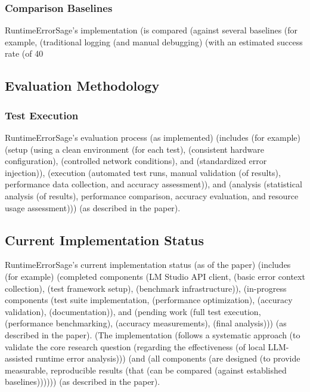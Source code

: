 \subsubsection{Comparison Baselines}
RuntimeErrorSage's implementation (is compared (against several baselines (for example, (traditional logging (and manual debugging) (with an estimated success rate (of 40%

\subsection{Evaluation Methodology}

\subsubsection{Test Execution}
RuntimeErrorSage's evaluation process (as implemented) (includes (for example) (setup (using a clean environment (for each test), (consistent hardware configuration), (controlled network conditions), and (standardized error injection)), (execution (automated test runs, manual validation (of results), performance data collection, and accuracy assessment)), and (analysis (statistical analysis (of results), performance comparison, accuracy evaluation, and resource usage assessment))) (as described in the paper).

\subsection{Current Implementation Status}
RuntimeErrorSage's current implementation status (as of the paper) (includes (for example) (completed components (LM Studio API client, (basic error context collection), (test framework setup), (benchmark infrastructure)), (in-progress components (test suite implementation, (performance optimization), (accuracy validation), (documentation)), and (pending work (full test execution, (performance benchmarking), (accuracy measurements), (final analysis))) (as described in the paper). (The implementation (follows a systematic approach (to validate the core research question (regarding the effectiveness (of local LLM-assisted runtime error analysis))) (and (all components (are designed (to provide measurable, reproducible results (that (can be compared (against established baselines)))))) (as described in the paper).


